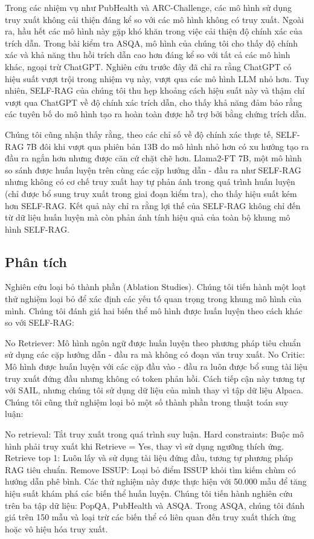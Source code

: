 \documentclass{article}
\begin{document}
Trong các nhiệm vụ như PubHealth và ARC-Challenge, các mô hình sử dụng truy xuất không cải thiện đáng kể so với các mô hình không có truy xuất. Ngoài ra, hầu hết các mô hình này gặp khó khăn trong việc cải thiện độ chính xác của trích dẫn. Trong bài kiểm tra ASQA, mô hình của chúng tôi cho thấy độ chính xác và khả năng thu hồi trích dẫn cao hơn đáng kể so với tất cả các mô hình khác, ngoại trừ ChatGPT. Nghiên cứu trước đây đã chỉ ra rằng ChatGPT có hiệu suất vượt trội trong nhiệm vụ này, vượt qua các mô hình LLM nhỏ hơn. Tuy nhiên, SELF-RAG của chúng tôi thu hẹp khoảng cách hiệu suất này và thậm chí vượt qua ChatGPT về độ chính xác trích dẫn, cho thấy khả năng đảm bảo rằng các tuyên bố do mô hình tạo ra hoàn toàn được hỗ trợ bởi bằng chứng trích dẫn.

Chúng tôi cũng nhận thấy rằng, theo các chỉ số về độ chính xác thực tế, SELF-RAG 7B đôi khi vượt qua phiên bản 13B do mô hình nhỏ hơn có xu hướng tạo ra đầu ra ngắn hơn nhưng được căn cứ chặt chẽ hơn. Llama2-FT 7B, một mô hình so sánh được huấn luyện trên cùng các cặp hướng dẫn - đầu ra như SELF-RAG nhưng không có cơ chế truy xuất hay tự phản ánh trong quá trình huấn luyện (chỉ được bổ sung truy xuất trong giai đoạn kiểm tra), cho thấy hiệu suất kém hơn SELF-RAG. Kết quả này chỉ ra rằng lợi thế của SELF-RAG không chỉ đến từ dữ liệu huấn luyện mà còn phản ánh tính hiệu quả của toàn bộ khung mô hình SELF-RAG.

\subsection{Phân tích}
Nghiên cứu loại bỏ thành phần (Ablation Studies). Chúng tôi tiến hành một loạt thử nghiệm loại bỏ để xác định các yếu tố quan trọng trong khung mô hình của mình. Chúng tôi đánh giá hai biến thể mô hình được huấn luyện theo cách khác so với SELF-RAG:

No Retriever: Mô hình ngôn ngữ được huấn luyện theo phương pháp tiêu chuẩn sử dụng các cặp hướng dẫn - đầu ra mà không có đoạn văn truy xuất.
No Critic: Mô hình được huấn luyện với các cặp đầu vào - đầu ra luôn được bổ sung tài liệu truy xuất đứng đầu nhưng không có token phản hồi. Cách tiếp cận này tương tự với SAIL, nhưng chúng tôi sử dụng dữ liệu của mình thay vì tập dữ liệu Alpaca.
Chúng tôi cũng thử nghiệm loại bỏ một số thành phần trong thuật toán suy luận:

No retrieval: Tắt truy xuất trong quá trình suy luận.
Hard constraints: Buộc mô hình phải truy xuất khi Retrieve = Yes, thay vì sử dụng ngưỡng thích ứng.
Retrieve top 1: Luôn lấy và sử dụng tài liệu đứng đầu, tương tự phương pháp RAG tiêu chuẩn.
Remove ISSUP: Loại bỏ điểm ISSUP khỏi tìm kiếm chùm có hướng dẫn phê bình.
Các thử nghiệm này được thực hiện với 50.000 mẫu để tăng hiệu suất khám phá các biến thể huấn luyện. Chúng tôi tiến hành nghiên cứu trên ba tập dữ liệu: PopQA, PubHealth và ASQA. Trong ASQA, chúng tôi đánh giá trên 150 mẫu và loại trừ các biến thể có liên quan đến truy xuất thích ứng hoặc vô hiệu hóa truy xuất.
\end{document}
